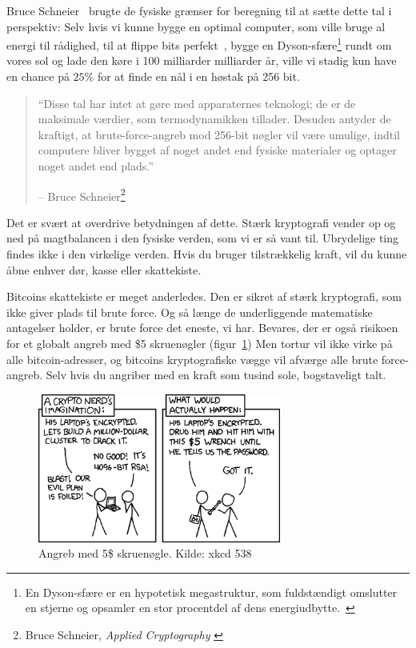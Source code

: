 \documentclass[paper=6in:9in,pagesize=pdftex,
               headinclude=on,footinclude=on,12pt]{scrbook}
\begin{document}
Bruce Schneier~\cite{web:schneier} brugte de fysiske grænser for beregning til at sætte dette tal i perspektiv: Selv hvis vi kunne bygge en optimal computer, som ville bruge al energi til rådighed, til at flippe bits perfekt~\cite{wiki:landauer}, bygge en Dyson-sfære\footnote{En Dyson-sfære er en hypotetisk megastruktur, som fuldstændigt omslutter en stjerne og opsamler en stor procentdel af dens energiudbytte.~\cite{wiki:dyson}} rundt om vores sol og lade den køre i 100 milliarder milliarder år, ville vi stadig kun have en chance på $25\%$ for at finde en nål i en høstak på 256 bit.\begin{quotation}\begin{samepage} \enquote{Disse tal har intet at gøre med apparaternes teknologi; de er de maksimale værdier, som termodynamikken tillader. Desuden antyder de kraftigt, at brute-force-angreb mod 256-bit nøgler vil være umulige, indtil computere bliver bygget af noget andet end fysiske materialer og optager noget andet end plads.} \begin{flushright} -- Bruce Schneier\footnote{Bruce Schneier, \textit{Applied Cryptography} \cite{bruce-schneier}}
\end{flushright}\end{samepage}\end{quotation}

Det er svært at overdrive betydningen af dette. Stærk kryptografi vender op og ned på magtbalancen i den fysiske verden, som vi er så vant til. Ubrydelige ting findes ikke i den virkelige verden. Hvis du bruger tilstrækkelig kraft, vil du kunne åbne enhver dør, kasse eller skattekiste.

Bitcoins skattekiste er meget anderledes. Den er sikret af stærk kryptografi, som ikke giver plads til brute force. Og så længe de underliggende matematiske antagelser holder, er brute force det eneste, vi har. Bevares, der er også risikoen for et globalt angreb med \$5 skruenøgler (figur~\ref{fig:xkcd-538}) Men tortur vil ikke virke på alle bitcoin-adresser, og bitcoins kryptografiske vægge vil afværge alle brute force-angreb. Selv hvis du angriber med en kraft som tusind sole, bogstaveligt talt.\begin{figure}
  \centering
  \includegraphics[width=8cm]{assets/images/xkcd-538.png}
  \caption{Angreb med 5\$ skruenøgle. Kilde: xkcd 538}
  \label{fig:xkcd-538}
\end{figure}
\end{document}
